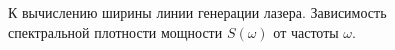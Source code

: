 \begin{figure}
\centering



\caption{К вычислению ширины линии генерации лазера. Зависимость
  спектральной плотности мощности $S\left(\omega\right)$ от частоты $\omega$.}
\label{figPart2Ch1_8}
\end{figure}
